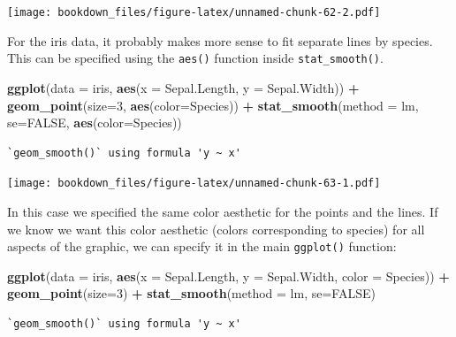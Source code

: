 \documentclass[
]{krantz}
\makeatletter
\newenvironment{Shaded}{\begin{snugshade}}{\end{snugshade}}
\newcommand{\DataTypeTok}[1]{\textcolor[rgb]{0.27,0.27,0.27}{#1}}
\newcommand{\DecValTok}[1]{\textcolor[rgb]{0.06,0.06,0.06}{#1}}
\newcommand{\KeywordTok}[1]{\textcolor[rgb]{0.27,0.27,0.27}{\textbf{#1}}}
\newcommand{\NormalTok}[1]{#1}
\newcommand{\OperatorTok}[1]{\textcolor[rgb]{0.43,0.43,0.43}{\textbf{#1}}}
\newcommand{\OtherTok}[1]{\textcolor[rgb]{0.37,0.37,0.37}{#1}}
\newcommand{\StringTok}[1]{\textcolor[rgb]{0.5,0.5,0.5}{#1}}
\newenvironment{kframe}{%
\medskip{}
\setlength{\fboxsep}{.8em}
 \def\at@end@of@kframe{}%
 \ifinner\ifhmode%
  \def\at@end@of@kframe{\end{minipage}}%
  \begin{minipage}{\columnwidth}%
 \fi\fi%
 \def\FrameCommand##1{\hskip\@totalleftmargin \hskip-\fboxsep
 \colorbox{shadecolor}{##1}\hskip-\fboxsep
     \hskip-\linewidth \hskip-\@totalleftmargin \hskip\columnwidth}%
 \MakeFramed {\advance\hsize-\width
   \@totalleftmargin\z@ \linewidth\hsize
   \@setminipage}}%
 {\par\unskip\endMakeFramed%
 \at@end@of@kframe}
\renewenvironment{Shaded}{\begin{kframe}}{\end{kframe}}
\makeatother
\begin{document}
\texttt{[image: bookdown\_files/figure-latex/unnamed-chunk-62-2.pdf]}

For the iris data, it probably makes more sense to fit separate lines by species. This can be specified using the \texttt{aes()} function inside \texttt{stat\_smooth()}.

\begin{Shaded}
\begin{Highlighting}[]
\KeywordTok{ggplot}\NormalTok{(}\DataTypeTok{data =}\NormalTok{ iris, }\KeywordTok{aes}\NormalTok{(}\DataTypeTok{x =}\NormalTok{ Sepal.Length, }\DataTypeTok{y =}\NormalTok{ Sepal.Width)) }\OperatorTok{+}\StringTok{ }
\StringTok{    }\KeywordTok{geom\_point}\NormalTok{(}\DataTypeTok{size=}\DecValTok{3}\NormalTok{, }\KeywordTok{aes}\NormalTok{(}\DataTypeTok{color=}\NormalTok{Species)) }\OperatorTok{+}\StringTok{ }
\StringTok{    }\KeywordTok{stat\_smooth}\NormalTok{(}\DataTypeTok{method =}\NormalTok{ lm, }\DataTypeTok{se=}\OtherTok{FALSE}\NormalTok{, }\KeywordTok{aes}\NormalTok{(}\DataTypeTok{color=}\NormalTok{Species))}
\end{Highlighting}
\end{Shaded}

\begin{verbatim}
`geom_smooth()` using formula 'y ~ x'
\end{verbatim}

\texttt{[image: bookdown\_files/figure-latex/unnamed-chunk-63-1.pdf]}

In this case we specified the same color aesthetic for the points and the lines. If we know we want this color aesthetic (colors corresponding to species) for all aspects of the graphic, we can specify it in the main \texttt{ggplot()} function:

\begin{Shaded}
\begin{Highlighting}[]
\KeywordTok{ggplot}\NormalTok{(}\DataTypeTok{data =}\NormalTok{ iris, }\KeywordTok{aes}\NormalTok{(}\DataTypeTok{x =}\NormalTok{ Sepal.Length, }\DataTypeTok{y =}\NormalTok{ Sepal.Width, }\DataTypeTok{color =}\NormalTok{ Species)) }\OperatorTok{+}\StringTok{ }
\StringTok{    }\KeywordTok{geom\_point}\NormalTok{(}\DataTypeTok{size=}\DecValTok{3}\NormalTok{) }\OperatorTok{+}\StringTok{ }\KeywordTok{stat\_smooth}\NormalTok{(}\DataTypeTok{method =}\NormalTok{ lm, }\DataTypeTok{se=}\OtherTok{FALSE}\NormalTok{)}
\end{Highlighting}
\end{Shaded}

\begin{verbatim}
`geom_smooth()` using formula 'y ~ x'
\end{verbatim}
\end{document}
